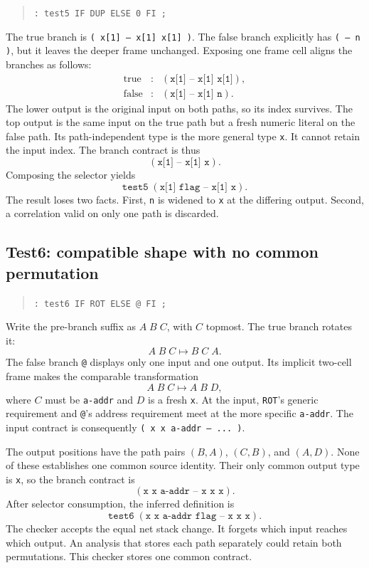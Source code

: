 \documentclass[11pt,a4paper]{article}
\newcommand{\effect}[1]{\mbox{\texttt{#1}}}
\begin{document}
\begin{quote}
\texttt{: test5  IF DUP ELSE 0 FI ;}
\end{quote}
The true branch is
\effect{( x[1] -- x[1] x[1] )}.  The false branch explicitly has
\effect{( -- n )}, but it leaves the deeper frame unchanged.  Exposing one
frame cell aligns the branches as follows:
\[
\begin{array}{rcl}
 \text{true}  &:& (\texttt{x[1] -- x[1] x[1]}),\\
 \text{false} &:& (\texttt{x[1] -- x[1] n}).
\end{array}
\]
The lower output is the original input on both paths, so its index survives.
The top output is the same input on the true path but a fresh numeric literal
on the false path.  Its path-independent type is the more general type
\texttt{x}.  It cannot retain the input index.  The branch contract is thus
\[
                       (\texttt{x[1] -- x[1] x}).
\]
Composing the selector yields
\[
             \texttt{test5}\;(\texttt{x[1] flag -- x[1] x}).
\]
The result loses two facts.  First, \texttt{n} is widened to \texttt{x} at the
differing output.  Second, a correlation valid on only one path is discarded.

\subsection{Test6: compatible shape with no common permutation}

\begin{quote}
\texttt{: test6  IF ROT ELSE @ FI ;}
\end{quote}
Write the pre-branch suffix as $A\;B\;C$, with $C$ topmost.  The true branch
rotates it:
\[
                         A\;B\;C \longmapsto B\;C\;A.
\]
The false branch \texttt{@} displays only one input and one output.  Its
implicit two-cell frame makes the comparable transformation
\[
                         A\;B\;C \longmapsto A\;B\;D,
\]
where $C$ must be \texttt{a-addr} and $D$ is a fresh \texttt{x}.  At the input,
\texttt{ROT}'s generic requirement and \texttt{@}'s address requirement meet
at the more specific \texttt{a-addr}.  The input contract is consequently
\effect{( x x a-addr -- ... )}.

The output positions have the path pairs $(B,A)$, $(C,B)$, and $(A,D)$.  None
of these establishes one common source identity.  Their only common output
type is \texttt{x}, so the branch contract is
\[
                  (\texttt{x x a-addr -- x x x}).
\]
After selector consumption, the inferred definition is
\[
       \texttt{test6}\;(\texttt{x x a-addr flag -- x x x}).
\]
The checker accepts the equal net stack change.  It forgets which input reaches
which output.  An analysis that stores each path separately could retain both
permutations.  This checker stores one common contract.
\end{document}
